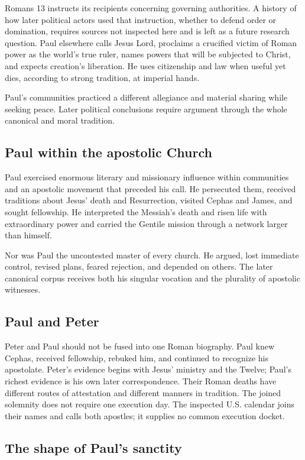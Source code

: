 Romans 13 instructs its recipients concerning governing authorities. A
history of how later political actors used that instruction, whether to defend
order or domination, requires sources not inspected here and is left as a
future research question. Paul elsewhere calls Jesus Lord, proclaims a
crucified victim of Roman power as the world's true ruler,
names powers that will be subjected to Christ, and expects creation's
liberation. He uses citizenship and law when useful yet dies, according to
strong tradition, at imperial hands.

Paul's communities practiced a different allegiance and material sharing while
seeking peace. Later political conclusions require argument through the whole
canonical and moral tradition.

\subsection{Paul within the apostolic Church}

Paul exercised enormous literary and missionary influence within communities
and an apostolic movement that preceded his call. He persecuted them, received
traditions about Jesus' death and Resurrection, visited Cephas and James, and
sought fellowship. He interpreted the Messiah's death and risen life with
extraordinary power and carried the Gentile mission through a network larger
than himself.

Nor was Paul the uncontested master of every church. He argued, lost immediate
control, revised plans, feared rejection, and depended on others. The later
canonical corpus receives both his singular vocation and the plurality of
apostolic witnesses.

\subsection{Paul and Peter}

Peter and Paul should not be fused into one Roman biography. Paul knew Cephas,
received fellowship, rebuked him, and continued to recognize his apostolate.
Peter's evidence begins with Jesus' ministry and the Twelve; Paul's richest
evidence is his own later correspondence. Their Roman deaths have different
routes of attestation and different manners in tradition. The joined solemnity
does not require one execution day. The inspected U.S. calendar joins their
names and calls both apostles; it supplies no common execution docket.

\subsection{The shape of Paul's sanctity}


